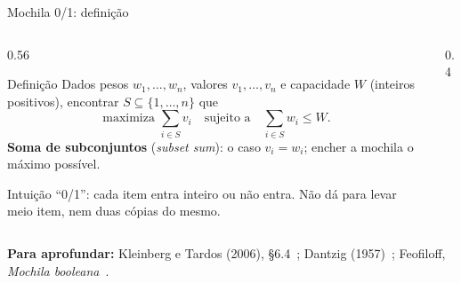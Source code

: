 \documentclass[aspectratio=169,xcolor=table]{beamer}
\newcommand{\fonte}[1]{%
  \vfill
  {\tiny\color{gray!55!black}\textbf{Para aprofundar:} #1\par}%
}
\begin{document}
\begin{frame}{Mochila 0/1: definição}
  \begin{columns}[c]
    \begin{column}{0.56\textwidth}
      \begin{block}{Definição}
        \scriptsize Dados pesos $w_1,\dots,w_n$, valores $v_1,\dots,v_n$ e capacidade $W$
        (inteiros positivos), encontrar $S \subseteq \{1,\dots,n\}$ que
        \[ \text{maximiza } \sum_{i\in S} v_i \quad\text{sujeito a}\quad \sum_{i\in S} w_i \le W. \]
        \textbf{Soma de subconjuntos} (\emph{subset sum}): o caso $v_i = w_i$; encher a
        mochila o máximo possível.
      \end{block}
      \begin{exampleblock}{Intuição}
        \scriptsize ``0/1'': cada item entra inteiro ou não entra. Não dá para levar meio
        item, nem duas cópias do mesmo.
      \end{exampleblock}
    \end{column}
    \begin{column}{0.4\textwidth}
      \centering
    \end{column}
  \end{columns}
  \fonte{Kleinberg e Tardos (2006), \S 6.4~\cite{kleinberg2006algorithm};
    Dantzig (1957)~\cite{dantzig1957discrete};
    Feofiloff, \emph{Mochila booleana}~\cite{feofiloff2015mochila}.}
\end{frame}
\end{document}
